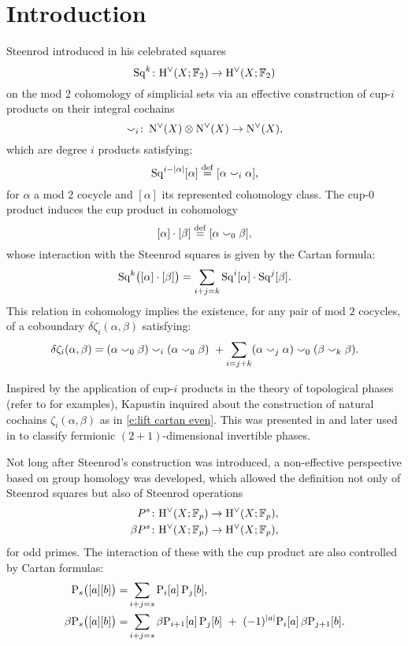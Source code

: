 
\section{Introduction} \label{s:introduction}

Steenrod introduced in \cite{steenrod1947products} his celebrated squares
\begin{equation*}
	\operatorname{Sq}^k \colon \mathrm{H}^\vee(X; {\mathbb{F}_2}) \to \mathrm{H}^\vee(X; {\mathbb{F}_2})
\end{equation*}
on the mod 2 cohomology of simplicial sets via an effective construction of cup-$i$ products on their integral cochains
\[
\smallsmile_i \colon \operatorname{N^{\vee}}(X) \otimes \operatorname{N^{\vee}}(X) \to \operatorname{N^{\vee}}(X),
\]
which are degree $i$ products satisfying:
\[
\operatorname{Sq}^{i-\lvert\alpha\rvert}[\alpha] \stackrel{\mathrm{def}}{=} [\alpha \smallsmile_i \alpha],
\]
for $\alpha$ a mod $2$ cocycle and $[\alpha]$ its represented cohomology class.
The cup-$0$ product induces the cup product in cohomology
\[
[\alpha] \cdot [\beta] \stackrel{\mathrm{def}}{=} [\alpha \smallsmile_0 \beta],
\]
whose interaction with the Steenrod squares is given by the Cartan formula:
\[
\operatorname{Sq}^k\!\big([\alpha] \cdot [\beta]\big) = \sum_{i+j=k} \operatorname{Sq}^i [\alpha] \cdot \operatorname{Sq}^j[\beta].
\]
This relation in cohomology implies the existence, for any pair of mod $2$ cocycles, of a coboundary $\delta\zeta_i(\alpha,\beta)$ satisfying:
\begin{equation}\label{e:lift cartan even}
	\delta\zeta_i(\alpha, \beta) =
	(\alpha \smallsmile_0 \beta) \smallsmile_i (\alpha \smallsmile_0 \beta) \ +
	\sum_{i=j+k} (\alpha \smallsmile_j \alpha) \smallsmile_0 (\beta \smallsmile_k \beta).
\end{equation}

Inspired by the application of cup-$i$ products in the theory of topological phases (refer to \cite{kapustin2015cobordism, gaiotto2016spin, kapustin2017fermionic} for examples), Kapustin inquired about the construction of natural cochains $\zeta_i(\alpha, \beta)$ as in \eqref{e:lift cartan even}.
This was presented in \cite{medina2020cartan} and later used in \cite{barkeshli2021classification} to classify fermionic $(2+1)$-dimensional invertible phases.

Not long after Steenrod's construction was introduced, a non-effective perspective based on group homology was developed, which allowed the definition not only of Steenrod squares but also of Steenrod operations
\begin{align*}
	P^s \colon& \mathrm{H}^\vee(X; {\mathbb{F}_p}) \to \mathrm{H}^\vee(X; {\mathbb{F}_p}), \\
	\beta P^s \colon& \mathrm{H}^\vee(X; {\mathbb{F}_p}) \to \mathrm{H}^\vee(X; {\mathbb{F}_p}),
\end{align*}
for odd primes.
The interaction of these with the cup product are also controlled by Cartan formulas:
\begin{align*}
	\mathrm{P}_s\big([a][b]\big) =&
	\sum_{i+j=s} \mathrm{P}_i[a] \, \mathrm{P}_j[b], \\
	\beta\mathrm{P}_s\big([a][b]\big) =&
	\sum_{i+j=s} \beta\mathrm{P}_{i+1}[a] \, \mathrm{P}_j[b] \ +\ (-1)^{\lvert a\rvert} \mathrm{P}_i[a] \, \beta\mathrm{P}_{j+1}[b].
\end{align*}

